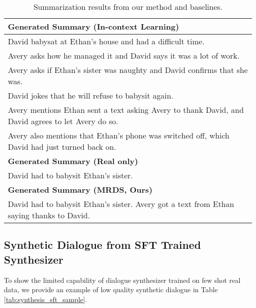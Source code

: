\begin{table*}[]
\begin{tabular}{l}
\hline
\textbf{Generated Summary (In-context Learning)} \\ \hline
David babysat at Ethan's house and had a difficult time. \\ Avery asks how he managed it and David says it was a lot of work. \\ Avery asks if Ethan's sister was naughty and David confirms that she was. \\ David jokes that he will refuse to babysit again. \\ Avery mentions Ethan sent a text asking Avery to thank David, and David agrees to let Avery do so.\\ Avery also mentions that Ethan's phone was switched off, which David had just turned back on. \\
\hline
\textbf{Generated Summary (Real only)} \\ \hline
David had to babysit Ethan's sister. \\
\hline
\textbf{Generated Summary (MRDS, Ours)} \\ \hline
David had to babysit Ethan's sister. Avery got a text from Ethan saying thanks to David.\\
\hline
\end{tabular}
\caption{Summarization results from our method and baselines.}
\label{tab:summ_example_1}
\end{table*}

\subsection{Synthetic Dialogue from SFT Trained Synthesizer}
To show the limited capability of dialogue synthesizer trained on few shot real data, we provide an example of low quality synthetic dialogue in Table \ref{tab:synthesis_sft_sample}.

